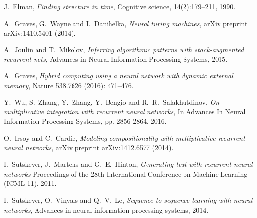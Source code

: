 \documentclass[english,letter paper,12pt,leqno]{article}
\theoremstyle{example}
\numberwithin{equation}{section}
\begin{document}

\providecommand{\bysame}{\leavevmode\hbox to3em{\hrulefill}\thinspace}
\providecommand{\href}[2]{#2}
\begin{thebibliography}{BHLS03}

J.~Elman, \textsl{Finding structure in time}, Cognitive science, 14(2):179–211, 1990.

A.~Graves, G.~Wayne and I.~Danihelka, \textsl{Neural turing machines}, arXiv preprint arXiv:1410.5401 (2014).

A.~Joulin and T.~Mikolov, \textsl{Inferring algorithmic patterns with stack-augmented recurrent nets}, Advances in Neural Information Processing Systems, 2015.

A.~Graves, \textsl{Hybrid computing using a neural network with dynamic external memory}, Nature 538.7626 (2016): 471--476.

Y.~Wu, S.~Zhang, Y.~Zhang, Y.~Bengio and R.~R.~Salakhutdinov, \textsl{On multiplicative integration with recurrent neural networks}, In Advances In Neural Information Processing Systems, pp. 2856-2864. 2016.

O.~Irsoy and C.~Cardie, \textsl{Modeling compositionality with multiplicative recurrent neural networks}, arXiv preprint arXiv:1412.6577 (2014).

I.~Sutskever, J.~Martens and G.~E.~Hinton, \textsl{Generating text with recurrent neural networks} Proceedings of the 28th International Conference on Machine Learning (ICML-11). 2011.

I.~Sutskever, O.~Vinyals and Q.~V.~Le, \textsl{Sequence to sequence learning with neural networks}, Advances in neural information processing systems, 2014.

\end{thebibliography}
\end{document}

